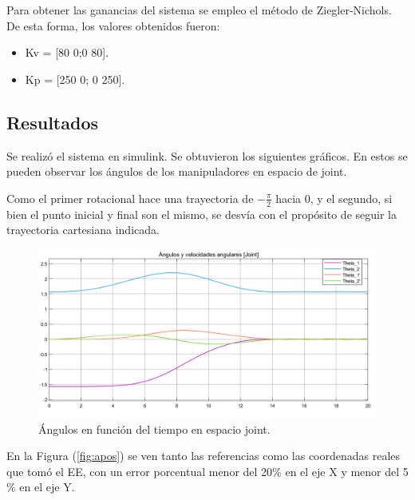 
Para obtener las ganancias del sistema se empleo el método de Ziegler-Nichols. De esta forma, los valores obtenidos fueron:
\begin{itemize}
	\item Kv = [80 0;0 80].
	\item Kp = [250 0; 0 250].
\end{itemize}

\subsection{Resultados}
Se realizó el sistema en simulink. Se obtuvieron los siguientes gráficos.
En estos se pueden observar los ángulos de los manipuladores en espacio de joint.

Como el primer rotacional hace una trayectoria de $-\frac{\pi}{2}$ hacia $0$, y el segundo, si bien el punto inicial y final son el mismo, se desvía con el propósito de seguir la trayectoria cartesiana indicada.

\begin{figure}[H]
	\centering
	\includegraphics[width=0.8\linewidth]{ImagenesControl de posición no lineal/1_3_a}
	\caption{Ángulos en función del tiempo en espacio joint.}	
	\label{fig:athetas}
\end{figure}


En la Figura (\ref{fig:apos}) se ven tanto las referencias como las coordenadas reales que tomó el EE, con un error porcentual menor del 20$\%$ en el eje X y menor del 5$\%$ en el eje Y. 


